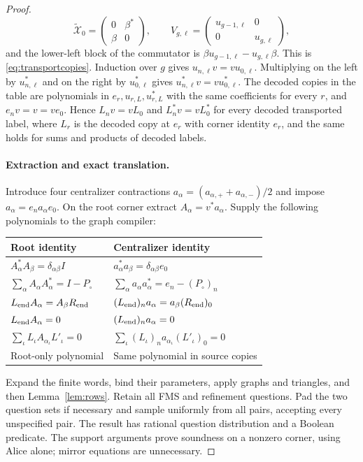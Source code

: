 \begin{proof}
\[ \widetilde{\mathcal X}_0=\begin{pmatrix}0&\beta^*\\\beta&0\end{pmatrix},\qquad
 V_{g,\ell}=\begin{pmatrix}u_{g-1,\ell}&0\\0&u_{g,\ell}\end{pmatrix},
\]
and the lower-left block of the commutator is $\beta u_{g-1,\ell}-u_{g,\ell}\beta$. This is \eqref{eq:transportcopies}. Induction over $g$ gives $u_{n,\ell}v=vu_{0,\ell}$. Multiplying on the left by $u_{n,\ell}^*$ and on the right by $u_{0,\ell}^*$ gives $u_{n,\ell}^*v=vu_{0,\ell}^*$. The decoded copies in the table are polynomials in $e_r,u_{r,L},u_{r,L}^*$ with the same coefficients for every $r$, and $e_nv=v=ve_0$. Hence $L_nv=vL_0$ and $L_n^*v=vL_0^*$ for every decoded transported label, where $L_r$ is the decoded copy at $e_r$ with corner identity $e_r$, and the same holds for sums and products of decoded labels.


\paragraph{Extraction and exact translation.}
Introduce four centralizer contractions $a_\alpha=(a_{\alpha,+}+a_{\alpha,-})/2$ and impose $a_\alpha=e_na_\alpha e_0$. On the root corner extract $A_\alpha=v^*a_\alpha$. Supply the following polynomials to the graph compiler:
\begin{center}\small
\begin{tabular}{@{}ll@{}}
\toprule
Root identity & Centralizer identity\\
\midrule
$A_\alpha^*A_\beta=\delta_{\alpha\beta}I$ & $a_\alpha^*a_\beta=\delta_{\alpha\beta}e_0$\\
$\sum_\alpha A_\alpha A_\alpha^*=I-P_{\circ}$ & $\sum_\alpha a_\alpha a_\alpha^*=e_n-(P_{\circ})_n$\\
$L_{\rm end}A_\alpha=A_\beta R_{\rm end}$ & $(L_{\rm end})_na_\alpha=a_\beta (R_{\rm end})_0$\\
$L_{\rm end}A_\alpha=0$ & $(L_{\rm end})_na_\alpha=0$\\
$\sum_\iota L_\iota A_{\alpha_\iota}L'_\iota=0$ & $\sum_\iota (L_\iota)_na_{\alpha_\iota}(L'_\iota)_0=0$\\
Root-only polynomial & Same polynomial in source copies\\
\bottomrule
\end{tabular}
\end{center}
Expand the finite words, bind their parameters, apply graphs and triangles, and then Lemma~\ref{lem:rows}. Retain all FMS and refinement questions. Pad the two question sets if necessary and sample uniformly from all pairs, accepting every unspecified pair. The result has rational question distribution and a Boolean predicate. The support arguments prove soundness on a nonzero corner, using Alice alone; mirror equations are unnecessary.


\end{proof}
